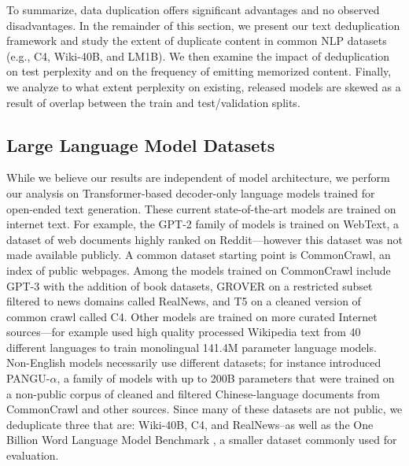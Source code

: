 To summarize, data duplication offers significant advantages and no observed disadvantages.
In the remainder of this section, we present our text deduplication framework and study the extent of duplicate content in common NLP datasets (e.g., C4, Wiki-40B, and LM1B).
We then examine the impact of deduplication on test perplexity and on the frequency of emitting memorized content.
Finally, we analyze to what extent perplexity on existing, released models are skewed as a result of overlap between the train and test/validation splits.

\subsection{Large Language Model Datasets}
While we believe our results are independent of model architecture,
we perform our analysis on Transformer-based decoder-only language models \citep{vaswani2017attention} trained for open-ended text generation.
These current state-of-the-art models are trained on internet text.
For example, the GPT-2 family of models \citet{radford2019language} is trained on WebText, a dataset of web documents highly ranked on Reddit---however this dataset was not made available publicly.
A common dataset starting point is CommonCrawl, an index of public webpages.
Among the models trained on CommonCrawl include
GPT-3 \cite{brown2020language} with the addition of book datasets,
GROVER \cite{zellers2019defending} on a restricted subset filtered to news domains called RealNews,
and T5 \cite{raffel2019exploring} on a cleaned version of common crawl called C4.
Other models are trained on more curated Internet sources---for example \citet{guo2020wiki40b} used high quality processed Wikipedia text from 40 different languages to train monolingual 141.4M parameter language models.
Non-English models necessarily use different datasets; \citet{zeng2021pangualpha} for instance introduced PANGU-$\alpha$, a family of models with up to 200B parameters that were trained on a non-public corpus of cleaned and filtered Chinese-language documents from CommonCrawl and other sources.
Since many of these datasets are not public,
we deduplicate three that are: Wiki-40B, C4, and RealNews--as well as the One Billion Word Language Model Benchmark \citep{chelba2013one}, 
a smaller
dataset commonly used for evaluation.

